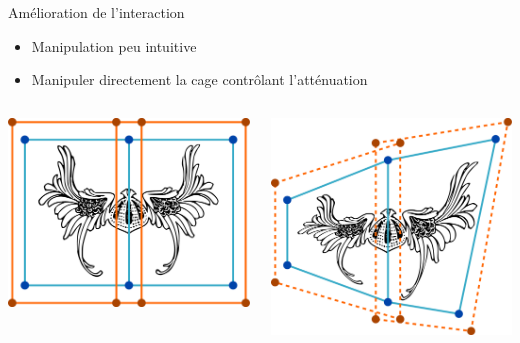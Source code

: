 \documentclass[xcolor=x11names,compress]{beamer}
\renewcommand{\(}{\begin{columns}} \renewcommand{\)}{\end{columns}}
\newcommand{\<}[1]{\begin{column}{#1}} \renewcommand{\>}{\end{column}}
\begin{document}
\begin{frame}{Amélioration de l'interaction}
  \begin{itemize}
    \item Manipulation peu intuitive
    \item Manipuler directement la cage contrôlant l'atténuation
  \end{itemize}
  \begin{columns}[t]
    \begin{column}{0.5\textwidth}
      \centering
      \includegraphics[scale=0.15]{Deformation-Viking-Avant}
    \end{column}
    \begin{column}{0.5\textwidth}
      \centering
      \includegraphics[scale=0.15]{Deformation-Viking-Apres-Avec}
    \end{column}
  \end{columns}
\end{frame}
\end{document}
